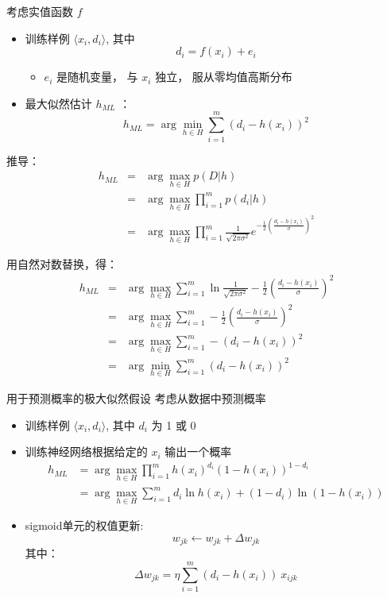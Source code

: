 \documentclass[presentation]{beamer}
\begin{document}
\begin{frame}[label={sec:org02ddb8d}]{考虑实值函数 \(f\)}
\begin{itemize}
\item 训练样例 \(\langle x_{i}, d_{i} \rangle\), 其中
$$d_{i} = f(x_{i}) + e_{i}$$
\begin{itemize}
\item \(e_{i}\) 是随机变量， 与 \(x_{i}\) 独立， 服从零均值高斯分布
\end{itemize}
\item 最大似然估计 \(h_{ML}\) ：
$$h_{ML} = \arg \min_{h \in H} \sum_{i=1}^{m} \left(d_{i} -h(x_{i})\right)^{2}$$
\end{itemize}
\end{frame}

\begin{frame}[label={sec:org8a8e977}]{推导：}
\begin{eqnarray}
h_{ML} &= &\arg \max_{h \in H} p(D|h) \nonumber \\
 &= &\arg \max_{h \in H} \prod_{i=1}^{m} p(d_{i}|h) \nonumber \\
&= &\arg \max_{h \in H} \prod_{i=1}^{m} \frac{1}{\sqrt{2 \pi \sigma^{2}}}
e^{-\frac{1}{2}(\frac{d_{i} - h(x_{i})}{\sigma})^{2}} \nonumber
\end{eqnarray}
\end{frame}

\begin{frame}[label={sec:orgf522311}]{用自然对数替换，得：}
\begin{eqnarray}
h_{ML}  &= &\arg \max_{h \in H}
\sum_{i=1}^{m} \ln \frac{1}{\sqrt{2 \pi \sigma^{2}}} -
\frac{1}{2}\left(\frac{d_{i} - h(x_{i})}{\sigma}\right)^{2} \nonumber \\
  &= &\arg \max_{h \in H} \sum_{i=1}^{m} -
\frac{1}{2}\left(\frac{d_{i} - h(x_{i})}{\sigma}\right)^{2} \nonumber \\
 &= &\arg \max_{h \in H} \sum_{i=1}^{m} - \left(d_{i} - h(x_{i})\right)^{2}
 \nonumber \\
 &= &\arg \min_{h \in H} \sum_{i=1}^{m} \left(d_{i} - h(x_{i})\right)^{2}  \nonumber
\end{eqnarray}
\end{frame}

\begin{frame}[label={sec:orge6c0f34}]{用于预测概率的极大似然假设}
考虑从数据中预测概率
\begin{itemize}
\item 训练样例 \(\langle x_{i}, d_{i} \rangle\), 其中 \(d_{i}\) 为 1 或 0
\item 训练神经网络根据给定的 \(x_i\) 输出一个概率
\begin{align*}
 h_{ML} &= \arg \max_{h \in H} \prod_{i=1}^{m} h(x_{i})^{d_i} (1 - h(x_{i}))^{1-d_{i}}\\
        &= \arg \max_{h \in H} \sum_{i=1}^{m} d_{i} \ln h(x_{i}) + (1-d_{i})\ln (1 - h(x_{i}))
\end{align*}
\item sigmoid单元的权值更新:
$$w_{jk} \leftarrow w_{jk} +  \Delta w_{jk}$$
其中：
 $$\Delta w_{jk} = \eta \sum_{i=1}^{m} (d_{i} - h(x_{i})) \  x_{ijk}$$
\end{itemize}
\end{frame}
\end{document}

